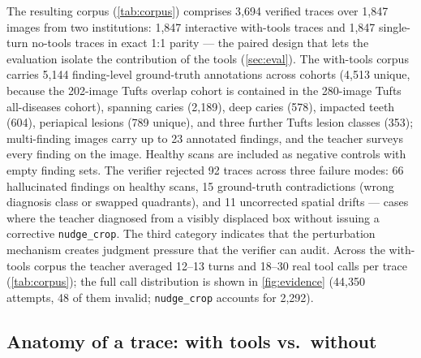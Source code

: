 The resulting corpus (\cref{tab:corpus}) comprises 3{,}694 verified traces over 1{,}847 images
from two institutions: 1{,}847 interactive with-tools traces and 1{,}847 single-turn no-tools
traces in exact 1:1 parity --- the paired design that lets the evaluation isolate the
contribution of the tools (\cref{sec:eval}). The with-tools corpus carries 5{,}144
finding-level ground-truth annotations across cohorts (4{,}513 unique, because the 202-image
Tufts overlap cohort is contained in the 280-image Tufts all-diseases cohort), spanning caries (2{,}189), deep caries (578), impacted teeth (604), periapical
lesions (789 unique), and three further Tufts lesion classes (353); multi-finding images carry
up to 23 annotated findings, and the teacher surveys every finding on the image. Healthy scans
are included as negative controls with empty finding sets. The verifier rejected 92 traces
across three failure modes: 66 hallucinated findings on healthy scans, 15 ground-truth
contradictions (wrong diagnosis class or swapped quadrants), and 11 uncorrected spatial drifts
--- cases where the teacher diagnosed from a visibly displaced box without issuing a corrective
\texttt{nudge\_crop}. The third category indicates that the perturbation mechanism
creates judgment pressure that the verifier can audit. Across the with-tools
corpus the teacher averaged 12--13 turns and 18--30 real tool calls per trace
(\cref{tab:corpus}); the full call distribution is shown in \cref{fig:evidence} (44{,}350 attempts, 48 of them invalid; \texttt{nudge\_crop} accounts for 2{,}292).

\begin{table}[tbp]
  \centering
  \small
  \caption{The verified corpus. With-tools and
  no-tools cohorts are in exact 1:1 parity (checkmarks). Turns and tool calls are for the
  with-tools side; findings are counted per cohort (the Tufts overlap cohort is a subset of the
  Tufts all-diseases cohort, so its findings are counted in both).}
  \label{tab:corpus}
  
\end{table}


\subsection{Anatomy of a trace: with tools vs.\ without}
\label{sec:traceanatomy}

